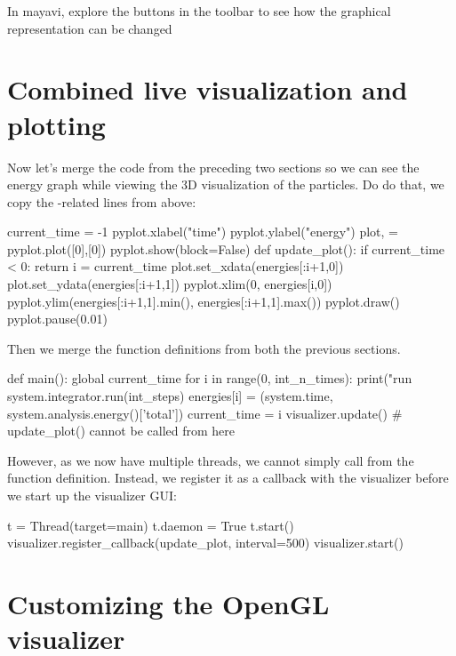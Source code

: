 \documentclass[
paper=a4,                       %
fontsize=11pt,                  %
twoside,                        %
footsepline,                    %
headsepline,                    %
headinclude=false,              %
footinclude=false,              %
pagesize,                       %
]{scrartcl}
\begin{document}
In mayavi, explore the buttons in the toolbar to see how the graphical representation can be changed

\section{Combined live visualization and plotting}

Now let's merge the code from the preceding two sections so we can see the energy graph while viewing the 3D visualization of the particles.
Do do that, we copy the -related lines from above:

\begin{pypresso}
current_time = -1
pyplot.xlabel("time")
pyplot.ylabel("energy")
plot, = pyplot.plot([0],[0])
pyplot.show(block=False)
def update_plot():
    if current_time < 0:
        return
    i = current_time
    plot.set_xdata(energies[:i+1,0])
    plot.set_ydata(energies[:i+1,1])
    pyplot.xlim(0, energies[i,0])
    pyplot.ylim(energies[:i+1,1].min(), energies[:i+1,1].max())
    pyplot.draw()
    pyplot.pause(0.01)
\end{pypresso}

Then we merge the  function definitions from both the previous sections.

\begin{pypresso}
def main():
    global current_time
    for i in range(0, int_n_times):
        print("run %
        system.integrator.run(int_steps)
        energies[i] = (system.time, system.analysis.energy()['total'])
        current_time = i
        visualizer.update()
        # update_plot() cannot be called from here
\end{pypresso}

However, as we now have multiple threads, we cannot simply call  from the  function definition.
Instead, we register it as a callback with the visualizer before we start up the visualizer GUI:

\begin{pypresso}
t = Thread(target=main)
t.daemon = True
t.start()
visualizer.register_callback(update_plot, interval=500)
visualizer.start()
\end{pypresso}

\section{Customizing the OpenGL visualizer}
\end{document}
